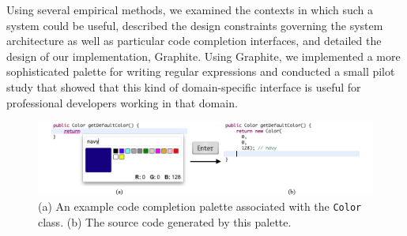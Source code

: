 Using several empirical methods, we examined the contexts in which such a system could be useful, described the design constraints governing the system architecture as well as particular code completion interfaces, and detailed the design of our implementation, Graphite. Using Graphite, we implemented a more sophisticated palette for writing regular expressions and conducted a small pilot study that showed that this kind of domain-specific interface is useful for professional developers working in that domain.

\begin{figure}\label{color}
\begin{center}
\includegraphics[width=40pc]{color_palette.png}\end{center}
\caption{(a) An example code completion palette associated with the \texttt{Color} class. (b) The source code generated by this palette.}
\end{figure}
